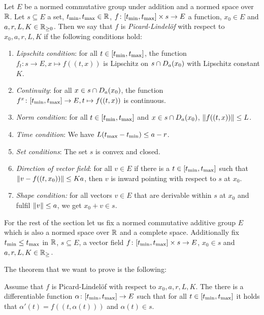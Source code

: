 \begin{defi}
Let $E$ be a normed commutative group under addition and a normed space over $\mathbb{R}$. 
Let $s \subseteq E$ a set, $t_{\text{min}}, t_{\text{max}} \in \mathbb{R}$, $f \colon [t_{\text{min}}, t_{\text{max}}] \times s \to E$ a function, $x_0 \in E$ and $a, r, L, K \in \mathbb{R}_{\ge 0}$. 
Then we say that $f$ is \emph{Picard-Lindelöf} with respect to $x_0, a, r, L, K$ if the following conditions hold: 
\begin{enumerate}
    \item \label{PicLindI} \emph{Lipschitz condition}: for all $t \in [t_{\text{min}}, t_{\text{max}}]$, the function $f_t \colon s \to E, x \mapsto f ((t, x))$ is Lipschitz on $s \cap D_{a}(x_0)$ with Lipschitz constant $K$. 
    \item \label{PicLindII} \emph{Continuity}: for all $x \in s \cap D_{a}(x_0)$, the function $f^x \colon [t_{\text{min}}, t_{\text{max}}] \to E, t \mapsto f ((t, x))$ is continuous. 
    \item \label{PicLindIII} \emph{Norm condition}: for all $t \in [t_{\text{min}}, t_{\text{max}}]$ and $x \in s \cap D_{a}(x_0)$, $\left\lVert f ((t, x))\right\rVert \le L$.
    \item \label{PicLindIV} \emph{Time condition}: We have $L (t_{\text{max}} - t_{\text{min}}) \le a - r$. 
    \item \label{PicLindV} \emph{Set conditions}: The set $s$ is convex and closed. 
    \item \label{PicLindVI}\emph{Direction of vector field}: for all $v \in E$ if there is a $t \in [t_{\text{min}}, t_{\text{max}}]$ such that $\left\lVert v - f ((t, x_0))\right\rVert \le Ka$, then $v$ is inward pointing with respect to $s$ at $x_0$.
    \item \label{PicLindVII}\emph{Shape condition:} for all vectors $v \in E$ that are derivable within $s$ at $x_0$ and fulfil $\left\lVert v\right\rVert \le a$, we get $x_0 + v \in s$. 
\end{enumerate}
\end{defi}

For the rest of the section let us fix a normed commutative additive group $E$ which is also a normed space over $\mathbb{R}$ and a complete space. Additionally fix $t_{\text{min}} \le t_{\text{max}}$ in $\mathbb{R}$, $s \subseteq E$, a vector field $f \colon [t_{\text{min}}, t_{\text{max}}] \times s \to E$, $x_0 \in s$ and $a, r, L, K \in \mathbb{R}_{\ge}$. 

The theorem that we want to prove is the following: 

\begin{lem}
Assume that $f$ is Picard-Lindelöf with respect to $x_0, a, r, L, K$. 
The there is a differentiable function $\alpha \colon [t_{\text{min}}, t_{\text{max}}] \to E$ such that for all $t \in [t_{\text{min}}, t_{\text{max}}]$ it holds that $\alpha'(t) = f ((t, \alpha (t)))$ and $\alpha(t) \in s$. 
\end{lem}


